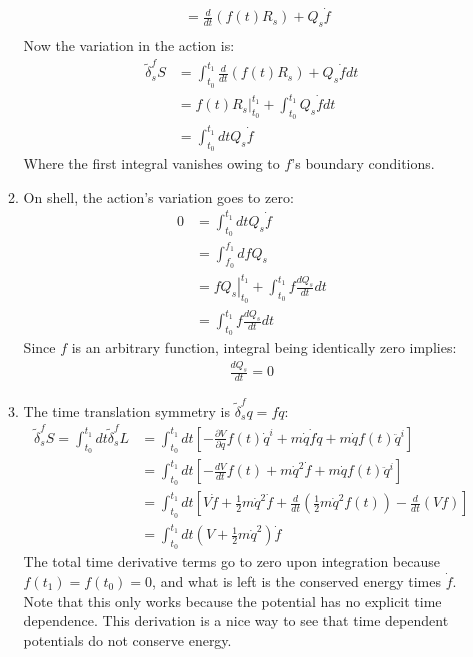\documentclass[12pt,a4]{article}
\begin{document}
\begin{enumerate}
\begin{enumerate}
\begin{align*}
                               &= \frac{d}{dt}\left(f(t) R_s\right) + Q_s \dot f\\
        \end{align*}
        Now the variation in the action is:
        \begin{align*}
          \tilde{\delta}_s^fS &= \int_{t_0}^{t_1} \frac{d}{dt}\left(f(t) R_s\right) + Q_s \dot f dt\\
                             &= \left.f(t) R_s\right|_{t_0}^{t_1} + \int_{t_0}^{t_1}Q_s \dot f dt\\
                             &= \int_{t_0}^{t_1} dt Q_s \dot f
        \end{align*}
        Where the first integral vanishes owing to $f$'s boundary conditions.
      \item
        On shell, the action's variation goes to zero:
        \begin{align*}
          0 &= \int_{t_0}^{t_1} dtQ_s \dot f\\
            &= \int_{f_0}^{f_1} df Q_s \\
            &= \left.fQ_s \right|_{t_0}^{t_1} + \int_{t_0}^{t_1} f \frac{dQ_s}{dt} dt \\
            &= \int_{t_0}^{t_1} f \frac{dQ_s}{dt} dt
        \end{align*}
        Since $f$ is an arbitrary function, integral being identically zero implies:
        \begin{align*}
          \frac{dQ_s}{dt} = 0
        \end{align*}
      \item
        The time translation symmetry is $\tilde{\delta}_s^f q = f \dot q$:
        \begin{align*}
          \tilde{\delta}_s^f S = 
          \int_{t_0}^{t_1} dt \tilde{\delta}_s^f L %
                               &= \int_{t_0}^{t_1} dt \left[ - \frac{\partial V}{\partial q} f(t) \dot q^i + m \dot q \dot f \dot q + m \dot q f(t) \ddot  q^i\right]\\
                               &= \int_{t_0}^{t_1} dt \left[ - \frac{d V}{d t} f(t) + m \dot q ^2\dot f  + m \dot q f(t) \ddot  q^i\right]\\
                               &= \int_{t_0}^{t_1} dt \left[V \dot f  + \frac{1}{2}m \dot q^2 \dot f  + \frac{d}{dt} \left(\frac{1}{2}m\dot q^2 f(t) \right)- \frac{d}{dt} \left(Vf\right)\right]\\
                               &= \int_{t_0}^{t_1} dt \left(V   + \frac{1}{2}m \dot q^2\right) \dot f
        \end{align*}
        The total time derivative terms go to zero upon integration because $f(t_1) = f(t_0) = 0$, and what is left is the conserved energy times $\dot f$.
        Note that this only works because the potential has no explicit time dependence.
        This derivation is a nice way to see that time dependent potentials do not conserve energy.

    \end{enumerate}
\end{enumerate}
\end{document}
